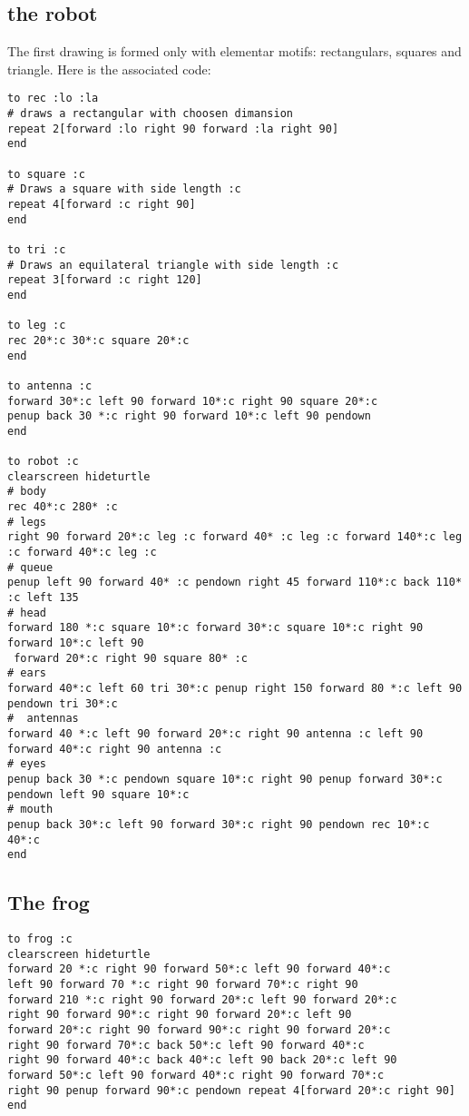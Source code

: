 \subsection{the robot}
The first drawing is formed only with elementar motifs: rectangulars, squares and triangle. Here is the associated code:
\begin{verbatim}
to rec :lo :la
# draws a rectangular with choosen dimansion
repeat 2[forward :lo right 90 forward :la right 90]
end

to square :c
# Draws a square with side length :c
repeat 4[forward :c right 90]
end

to tri :c
# Draws an equilateral triangle with side length :c
repeat 3[forward :c right 120]
end

to leg :c
rec 20*:c 30*:c square 20*:c
end

to antenna :c
forward 30*:c left 90 forward 10*:c right 90 square 20*:c
penup back 30 *:c right 90 forward 10*:c left 90 pendown
end

to robot :c
clearscreen hideturtle
# body
rec 40*:c 280* :c
# legs
right 90 forward 20*:c leg :c forward 40* :c leg :c forward 140*:c leg :c forward 40*:c leg :c
# queue
penup left 90 forward 40* :c pendown right 45 forward 110*:c back 110* :c left 135
# head
forward 180 *:c square 10*:c forward 30*:c square 10*:c right 90 forward 10*:c left 90
 forward 20*:c right 90 square 80* :c
# ears
forward 40*:c left 60 tri 30*:c penup right 150 forward 80 *:c left 90 pendown tri 30*:c
#  antennas
forward 40 *:c left 90 forward 20*:c right 90 antenna :c left 90 forward 40*:c right 90 antenna :c
# eyes 
penup back 30 *:c pendown square 10*:c right 90 penup forward 30*:c pendown left 90 square 10*:c
# mouth
penup back 30*:c left 90 forward 30*:c right 90 pendown rec 10*:c 40*:c
end

\end{verbatim}
\subsection{The frog}
\begin{verbatim}
to frog :c
clearscreen hideturtle
forward 20 *:c right 90 forward 50*:c left 90 forward 40*:c 
left 90 forward 70 *:c right 90 forward 70*:c right 90
forward 210 *:c right 90 forward 20*:c left 90 forward 20*:c 
right 90 forward 90*:c right 90 forward 20*:c left 90
forward 20*:c right 90 forward 90*:c right 90 forward 20*:c 
right 90 forward 70*:c back 50*:c left 90 forward 40*:c 
right 90 forward 40*:c back 40*:c left 90 back 20*:c left 90 
forward 50*:c left 90 forward 40*:c right 90 forward 70*:c 
right 90 penup forward 90*:c pendown repeat 4[forward 20*:c right 90]
end

\end{verbatim}

